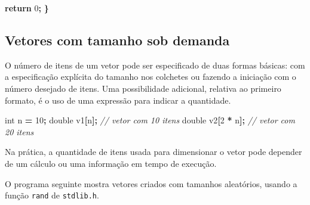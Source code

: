 \documentclass[
  11pt,
  a4paper,
]{scrbook}
\newenvironment{Shaded}{\begin{snugshade}}{\end{snugshade}}
\newcommand{\CommentTok}[1]{\textcolor[rgb]{0.56,0.35,0.01}{\textit{#1}}}
\newcommand{\ControlFlowTok}[1]{\textcolor[rgb]{0.13,0.29,0.53}{\textbf{#1}}}
\newcommand{\DataTypeTok}[1]{\textcolor[rgb]{0.13,0.29,0.53}{#1}}
\newcommand{\DecValTok}[1]{\textcolor[rgb]{0.00,0.00,0.81}{#1}}
\newcommand{\NormalTok}[1]{#1}
\newcommand{\OperatorTok}[1]{\textcolor[rgb]{0.81,0.36,0.00}{\textbf{#1}}}
\begin{document}
\begin{Shaded}
\begin{Highlighting}[]
    \ControlFlowTok{return} \DecValTok{0}\OperatorTok{;}
\OperatorTok{\}}
\end{Highlighting}
\end{Shaded}

\begin{Shaded}
\end{Shaded}

\subsection{Vetores com tamanho sob
demanda}\label{vetores-com-tamanho-sob-demanda}

O número de itens de um vetor pode ser especificado de duas formas
básicas: com a especificação explícita do tamanho nos colchetes ou
fazendo a iniciação com o número desejado de itens. Uma possibilidade
adicional, relativa ao primeiro formato, é o uso de uma expressão para
indicar a quantidade.

\begin{Shaded}
\begin{Highlighting}[]
\DataTypeTok{int}\NormalTok{ n }\OperatorTok{=} \DecValTok{10}\OperatorTok{;}
\DataTypeTok{double}\NormalTok{ v1}\OperatorTok{[}\NormalTok{n}\OperatorTok{];}  \CommentTok{// vetor com 10 itens}
\DataTypeTok{double}\NormalTok{ v2}\OperatorTok{[}\DecValTok{2} \OperatorTok{*}\NormalTok{ n}\OperatorTok{];}  \CommentTok{// vetor com 20 itens}
\end{Highlighting}
\end{Shaded}

Na prática, a quantidade de itens usada para dimensionar o vetor pode
depender de um cálculo ou uma informação em tempo de execução.

O programa seguinte mostra vetores criados com tamanhos aleatórios,
usando a função \texttt{rand} de \texttt{stdlib.h}.
\end{document}
